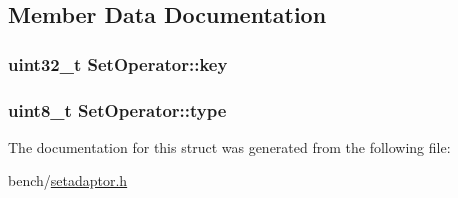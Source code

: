 \subsection{Member Data Documentation}
\hypertarget{structSetOperator_a18589e630d741299cd82ae90a253876a}{
\subsubsection[{key}]{\setlength{\rightskip}{0pt plus 5cm}uint32\-\_\-t Set\-Operator\-::key}}\label{structSetOperator_a18589e630d741299cd82ae90a253876a}
\hypertarget{structSetOperator_a86e4024f246f1d52a823213f46fcfb85}{
\subsubsection[{type}]{\setlength{\rightskip}{0pt plus 5cm}uint8\-\_\-t Set\-Operator\-::type}}\label{structSetOperator_a86e4024f246f1d52a823213f46fcfb85}


The documentation for this struct was generated from the following file\-:\begin{DoxyCompactItemize}
\item 
bench/\hyperlink{setadaptor_8h}{setadaptor.\-h}\end{DoxyCompactItemize}
